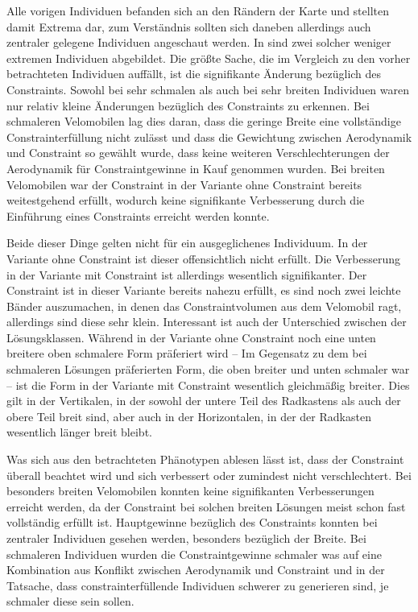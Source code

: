 Alle vorigen Individuen befanden sich an den Rändern der Karte und stellten damit Extrema dar, zum Verständnis sollten sich daneben allerdings auch zentraler gelegene Individuen angeschaut werden.
In  sind zwei solcher weniger extremen Individuen abgebildet.
Die größte Sache, die im Vergleich zu den vorher betrachteten Individuen auffällt, ist die signifikante Änderung bezüglich des Constraints.
Sowohl bei sehr schmalen als auch bei sehr breiten Individuen waren nur relativ kleine Änderungen bezüglich des Constraints zu erkennen.
Bei schmaleren Velomobilen lag dies daran, dass die geringe Breite eine vollständige Constrainterfüllung nicht zulässt und dass die Gewichtung zwischen Aerodynamik und Constraint so gewählt wurde, dass keine weiteren Verschlechterungen der Aerodynamik für Constraintgewinne in Kauf genommen wurden.
Bei breiten Velomobilen war der Constraint in der Variante ohne Constraint bereits weitestgehend erfüllt, wodurch keine signifikante Verbesserung durch die Einführung eines Constraints erreicht werden konnte.

Beide dieser Dinge gelten nicht für ein ausgeglichenes Individuum.
In der Variante ohne Constraint ist dieser offensichtlich nicht erfüllt.
Die Verbesserung in der Variante mit Constraint ist allerdings wesentlich signifikanter.
Der Constraint ist in dieser Variante bereits nahezu erfüllt, es sind noch zwei leichte Bänder auszumachen, in denen das Constraintvolumen aus dem Velomobil ragt, allerdings sind diese sehr klein.
Interessant ist auch der Unterschied zwischen der Lösungsklassen.
Während in der Variante ohne Constraint noch eine unten breitere oben schmalere Form präferiert wird -- Im Gegensatz zu dem bei schmaleren Lösungen präferierten Form, die oben breiter und unten schmaler war -- ist die Form in der Variante mit Constraint wesentlich gleichmäßig breiter.
Dies gilt in der Vertikalen, in der sowohl der untere Teil des Radkastens als auch der obere Teil breit sind, aber auch in der Horizontalen, in der der Radkasten wesentlich länger breit bleibt.

Was sich aus den betrachteten Phänotypen ablesen lässt ist, dass der Constraint überall beachtet wird und sich verbessert oder zumindest nicht verschlechtert.
Bei besonders breiten Velomobilen konnten keine signifikanten Verbesserungen erreicht werden, da der Constraint bei solchen breiten Lösungen meist schon fast vollständig erfüllt ist.
Hauptgewinne bezüglich des Constraints konnten bei zentraler Individuen gesehen werden, besonders bezüglich der Breite.
Bei schmaleren Individuen wurden die Constraintgewinne schmaler was auf eine Kombination aus Konflikt zwischen Aerodynamik und Constraint und in der Tatsache, dass constrainterfüllende Individuen schwerer zu generieren sind, je schmaler diese sein sollen.



